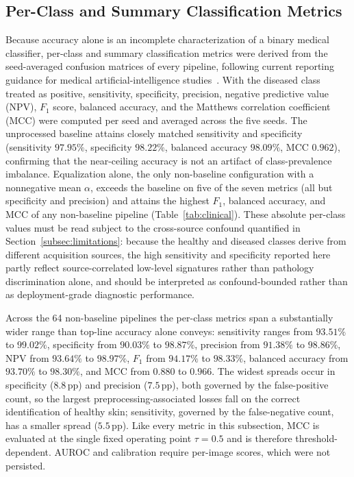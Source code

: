 \documentclass[preprint,review,12pt]{elsarticle}
\begin{document}
\subsection{Per-Class and Summary Classification Metrics}
\label{subsec:clinical_metrics}

Because accuracy alone is an incomplete characterization of a binary medical classifier, per-class and summary classification metrics were derived from the seed-averaged confusion matrices of every pipeline, following current reporting guidance for medical artificial-intelligence studies~\cite{Mongan2020, Collins2024}. With the diseased class treated as positive, sensitivity, specificity, precision, negative predictive value (NPV), $F_1$ score, balanced accuracy, and the Matthews correlation coefficient (MCC) were computed per seed and averaged across the five seeds. The unprocessed baseline attains closely matched sensitivity and specificity (sensitivity $97.95\%$, specificity $98.22\%$, balanced accuracy $98.09\%$, MCC $0.962$), confirming that the near-ceiling accuracy is not an artifact of class-prevalence imbalance. Equalization alone, the only non-baseline configuration with a nonnegative mean $\alpha$, exceeds the baseline on five of the seven metrics (all but specificity and precision) and attains the highest $F_1$, balanced accuracy, and MCC of any non-baseline pipeline (Table~\ref{tab:clinical}). These absolute per-class values must be read subject to the cross-source confound quantified in Section~\ref{subsec:limitations}: because the healthy and diseased classes derive from different acquisition sources, the high sensitivity and specificity reported here partly reflect source-correlated low-level signatures rather than pathology discrimination alone, and should be interpreted as confound-bounded rather than as deployment-grade diagnostic performance.

Across the 64 non-baseline pipelines the per-class metrics span a substantially wider range than top-line accuracy alone conveys: sensitivity ranges from $93.51\%$ to $99.02\%$, specificity from $90.03\%$ to $98.87\%$, precision from $91.38\%$ to $98.86\%$, NPV from $93.64\%$ to $98.97\%$, $F_1$ from $94.17\%$ to $98.33\%$, balanced accuracy from $93.70\%$ to $98.30\%$, and MCC from $0.880$ to $0.966$. The widest spreads occur in specificity ($8.8$\,pp) and precision ($7.5$\,pp), both governed by the false-positive count, so the largest preprocessing-associated losses fall on the correct identification of healthy skin; sensitivity, governed by the false-negative count, has a smaller spread ($5.5$\,pp). Like every metric in this subsection, MCC is evaluated at the single fixed operating point $\tau = 0.5$ and is therefore threshold-dependent. AUROC and calibration require per-image scores, which were not persisted.
\end{document}
